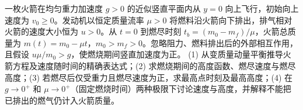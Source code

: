 一枚火箭在均匀重力加速度 \(g>0\) 的近似竖直平面内从 \(y=0\) 向上飞行，初始向上速度为 \(v_0\ge0\)。发动机以恒定质量流率 \(\mu>0\) 将燃料沿火箭向下排出，排气相对火箭的速度大小恒为 \(u>0\)。从 \(t=0\) 到燃尽时刻 \(t_b=(m_0-m_f)/\mu\)，火箭总质量为 \(m(t)=m_0-\mu t\)，\(m_0>m_f>0\)。忽略阻力、燃料排出后的外部相互作用，且假设 \(u\mu/m_0>g\)，使燃烧期间竖直加速度为正。
(1) 从变质量动量平衡推导火箭方程及速度随时间的精确表达式；(2) 求燃烧期间的高度函数、燃尽速度与燃尽高度；(3) 若燃尽后仅受重力且燃尽速度为正，求最高点时刻及最高高度；(4) 在 \(g\to0^+\) 和 \(\mu\to0^+\)（固定燃烧时间）两种极限下讨论速度与高度，并解释不能把已排出的燃气仍计入火箭质量。
